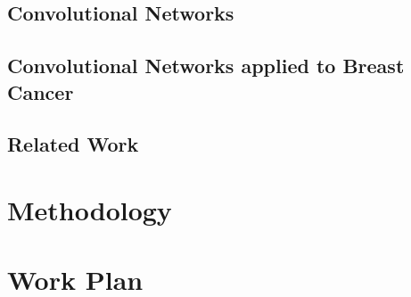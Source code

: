 \documentclass[11pt]{article}
\begin{document}
	\subsection{Convolutional Networks}
	\label{subsec:ConvNets}

	\subsection{Convolutional Networks applied to Breast Cancer}
	\label{subsec:BreastCancerConvNets}	

	\subsection{Related Work}
	\label{subsec:RelatedWork}
	

\section{Methodology}
\label{sec:Methodology}


\section{Work Plan}




\end{document}

